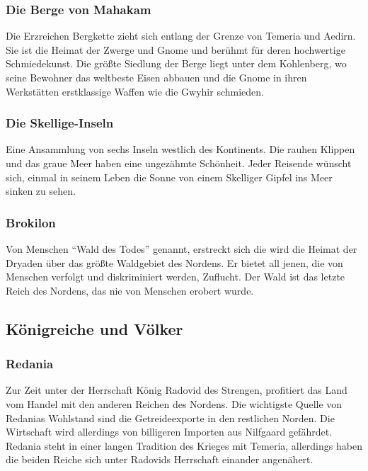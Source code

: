 \documentclass[parskip=full,11pt,%
footheight=38pt]{scrreport}
\begin{document}
	\subsubsection{Die Berge von Mahakam}
	Die Erzreichen Bergkette zieht sich entlang der Grenze von Temeria und Aedirn. Sie ist die Heimat der Zwerge und Gnome und berühmt für deren hochwertige Schmiedekunst. Die größte Siedlung der Berge liegt unter dem Kohlenberg, wo seine Bewohner das weltbeste Eisen abbauen und die Gnome in ihren Werkstätten erstklassige Waffen wie die Gwyhir schmieden.

	\subsubsection{Die Skellige-Inseln}
	Eine Ansammlung von sechs Inseln westlich des Kontinents. Die rauhen Klippen und das graue Meer haben eine ungezähmte Schönheit. Jeder Reisende wünscht sich, einmal in seinem Leben die Sonne von einem Skelliger Gipfel ins Meer sinken zu sehen.

	\subsubsection{Brokilon}
	Von Menschen ``Wald des Todes'' genannt, erstreckt sich die wird die Heimat der Dryaden über das größte Waldgebiet des Nordens. Er bietet all jenen, die von Menschen verfolgt und diskriminiert werden, Zuflucht. Der Wald ist das letzte Reich des Nordens, das nie von Menschen erobert wurde.

	\subsection{Königreiche und Völker}
	\subsubsection{Redania}
	Zur Zeit unter der Herrschaft König Radovid des Strengen, profitiert das Land vom Handel mit den anderen Reichen des Nordens. Die wichtigste Quelle von Redanias Wohlstand sind die Getreideexporte in den restlichen Norden. Die Wirtschaft wird allerdings von billigeren Importen aus Nilfgaard gefährdet. Redania steht in einer langen Tradition des Krieges mit Temeria, allerdings haben die beiden Reiche sich unter Radovids Herrschaft einander angenähert.
\end{document}
